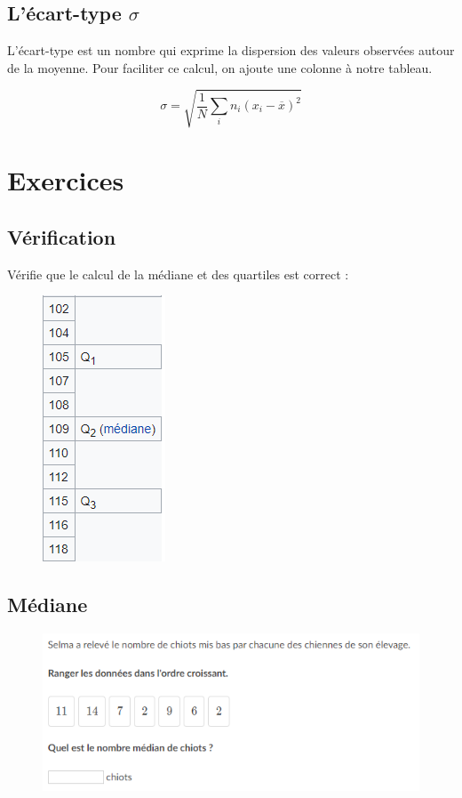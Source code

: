 \documentclass[utf8, a4paper, 12 pt]{article}
\begin{document}
    \subsection{L'écart-type \(\sigma\)}
    L'écart-type est un nombre qui exprime la dispersion des valeurs observées autour de la moyenne. 
    Pour faciliter ce calcul, on ajoute une colonne à notre tableau.

    \[\sigma = \sqrt{\frac{1}{N} \sum_{i} {n_i ( x_i - \overline{x})^2} }\]

    \newpage
    \section{Exercices}

        \subsection{Vérification}
            Vérifie que le calcul de la médiane et des quartiles est correct :
            \begin{figure}[H]
                \centering
                \includegraphics[height=0.6\linewidth]{img/quartile.PNG}
            \end{figure}

            \subsection{Médiane}
                \begin{figure}[H]
                    \centering
                    \includegraphics[width=0.9\linewidth]{img/mediane.PNG}
                \end{figure}
\end{document}
